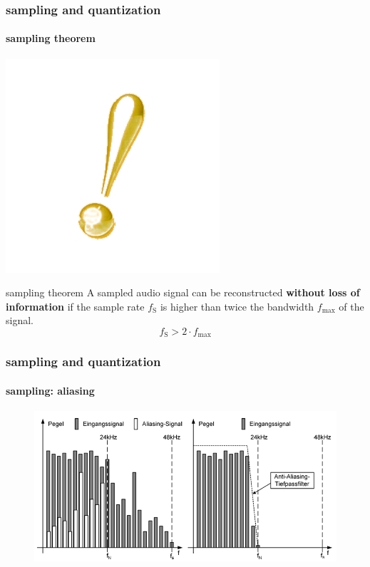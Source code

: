 	\begin{frame}\frametitle{sampling and quantization}\framesubtitle{sampling theorem}
		\vspace{-10mm}
        \begin{flushright}
			 \includegraphics[scale=.25]{Graph/exclamation-mark}
		\end{flushright}
		\begin{block}{sampling theorem}
			\centering
			A sampled audio signal can  be reconstructed \textbf{without loss of information} if the sample rate $f_{\mathrm{S}}$ is higher than twice the bandwidth $f_{\mathrm{max}}$  of the signal.
			\begin{equation}\label{eq:sample_theorem}	
				f_{\mathrm{S}} > 2\cdot f_{\mathrm{max}}
			\end{equation}
		\end{block}
	\end{frame}
	
	\begin{frame}\frametitle{sampling and quantization}\framesubtitle{sampling: aliasing}
		\begin{figure}
			\begin{center}
				\includegraphics[scale=0.5]{Graph/aliasing}
			\end{center}
		\end{figure} 
	\end{frame}	

